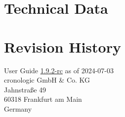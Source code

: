 \documentclass[12pt,notitlepage,a4paper]{report}
\newcommand{\ifxHPTDC}[2]{#1}
\newcommand{\ifxHPTDC}[2]{#2}
\newcommand{\ttinput}[1]{}
\newcommand{\ttinput}[1]{}
\newcommand{\ttinput}[1]{}
\newcommand{\ugrev}{{1.9.2-rc}}
\begin{document}
    \chapter{Technical Data}    
        \ttinput{Tech.tex} 
        

    \ifxHPTDC{}{
    \chapter{Ordering Information} \label{cp:ordering_information}
        
    }

    
    \chapter{Revision History} 
        \noindent
        User Guide \hyperlink{ugrev}{\ugrev} as of 2024-07-03\\  %
        cronologic GmbH \& Co. KG\\
        Jahnstraße 49\\
        60318 Frankfurt am Main\\Germany\\
        \ttinput{FwRev.tex}
        \ifxHPTDC{}{} 
        

    \ifxHPTDC{}{
    \phantomsection
    \addcontentsline{toc}{chapter}{Erratum}
    \chapter*{Erratum}
        
    }
\end{document}
